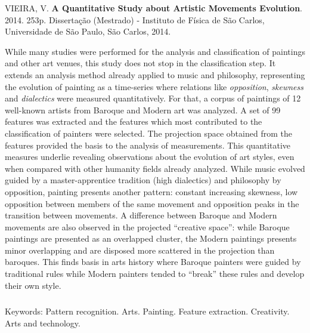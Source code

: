 \afterpage{\blankpage}

\begin{abstract2}
\vspace{-10mm}
VIEIRA, V. \textbf{A Quantitative Study about Artistic Movements Evolution}. 2014. 253p. Dissertação (Mestrado) - Instituto de Física de São Carlos, Universidade de São Paulo, São Carlos, 2014.
\vspace{15mm}

  While many studies were performed for the analysis and classification of
  paintings and other art venues, this study does not stop in the classification
  step. It extends an analysis method already applied to music and philosophy,
  representing the evolution of painting as a time-series where relations like
  \textit{opposition}, \textit{skewness} and \textit{dialectics} were measured
  quantitatively. For that, a corpus of paintings of 12 well-known artists from
  Baroque and Modern art was analyzed. A set of 99 features was extracted and
  the features which most contributed to the classification of painters were
  selected. The projection space obtained from the features provided the basis
  to the analysis of measurements. This quantitative measures underlie revealing
  observations about the evolution of art styles, even when compared with other
  humanity fields already analyzed. While music evolved guided by a
  master-apprentice tradition (high dialectics) and philosophy by opposition,
  painting presents another pattern: constant increasing skewness, low
  opposition between members of the same movement and opposition peaks in the
  transition between movements. A difference between Baroque and Modern
  movements are also observed in the projected ``creative space'': while Baroque
  paintings are presented as an overlapped cluster, the Modern paintings
  presents minor overlapping and are disposed more scattered in the projection
  than baroques. This finds basis in arts history where Baroque painters were
  guided by traditional rules while Modern painters tended to ``break'' these
  rules and develop their own style.

$\phantom{linha em branco}$\\
Keywords: Pattern recognition. Arts. Painting. Feature
extraction. Creativity. Arts and technology.

\end{abstract2}
